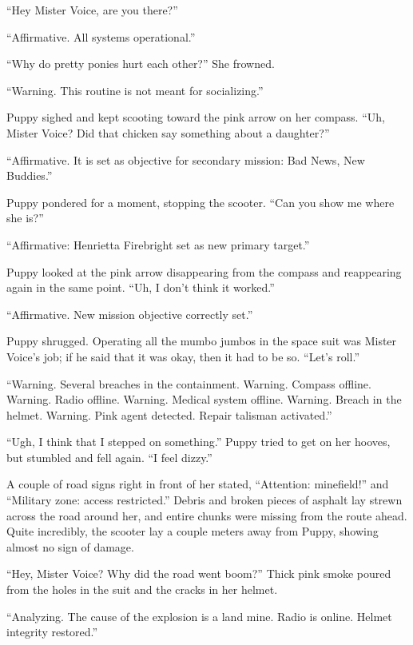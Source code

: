 ``Hey Mister Voice, are you there?''

{\mt ``Affirmative. All systems operational.''}

``Why do pretty ponies hurt each other?'' She frowned.

{\mt ``Warning. This routine is not meant for socializing.''}

Puppy sighed and kept scooting toward the pink arrow on her compass. ``Uh, Mister Voice? Did that chicken say something about a daughter?''

{\mt ``Affirmative. It is set as objective for secondary mission: Bad News, New Buddies.''}

Puppy pondered for a moment, stopping the scooter. ``Can you show me where she is?''

{\mt ``Affirmative: Henrietta Firebright set as new primary target.''}

Puppy looked at the pink arrow disappearing from the compass and reappearing again in the same point. ``Uh, I don't think it worked.''

{\mt ``Affirmative. New mission objective correctly set.''}

Puppy shrugged. Operating all the mumbo jumbos in the space suit was Mister Voice's job; if he said that it was okay, then it had to be so. ``Let's roll.''


\horizonline


{\mt ``Warning. Several breaches in the containment. Warning. Compass offline. Warning. Radio offline. Warning. Medical system offline. Warning. Breach in the helmet. Warning. Pink agent detected. Repair talisman activated.''}

``Ugh, I think that I stepped on something.'' Puppy tried to get on her hooves, but stumbled and fell again. ``I feel dizzy.''

A couple of road signs right in front of her stated, ``Attention: minefield!'' and ``Military zone: access restricted.'' Debris and broken pieces of asphalt lay strewn across the road around her, and entire chunks were missing from the route ahead. Quite incredibly, the scooter lay a couple meters away from Puppy, showing almost no sign of damage.

``Hey, Mister Voice? Why did the road went boom?'' Thick pink smoke poured from the holes in the suit and the cracks in her helmet.

{\mt ``Analyzing. The cause of the explosion is a land mine. Radio is online. Helmet integrity restored.''}


